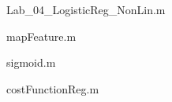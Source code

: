 \documentclass[10pt, a4paper]{article}
\begin{document}
Lab\_04\_LogisticReg\_NonLin.m


\newpage
mapFeature.m


sigmoid.m


costFunctionReg.m

\end{document}

